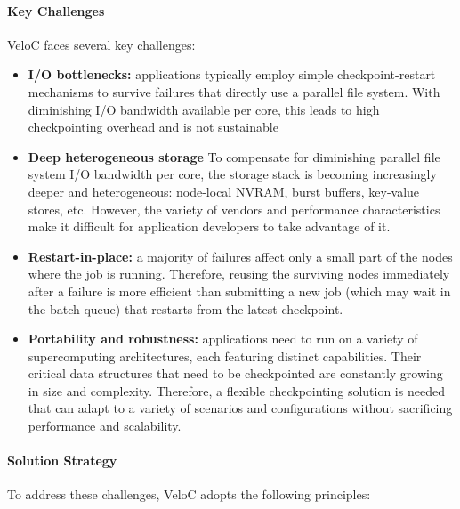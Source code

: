 \paragraph{Key Challenges}
VeloC faces several key challenges:
\begin{itemize}
    \item \textbf{I/O bottlenecks:} applications typically employ simple checkpoint-restart mechanisms to survive failures that directly use a parallel file system. With diminishing I/O bandwidth available per 
    core, this leads to high checkpointing overhead and is not sustainable
    \item \textbf{Deep heterogeneous storage} To compensate for diminishing
    parallel file system I/O bandwidth per core, the storage stack
    is becoming increasingly deeper and heterogeneous: node-local NVRAM, burst buffers, key-value stores, etc. However, the variety of vendors and performance characteristics make it difficult for application developers to take advantage of it.
    \item \textbf{Restart-in-place:} a majority of failures affect only a small
    part of the nodes where the job is running. Therefore, reusing the 
    surviving nodes immediately after a failure is more efficient than
    submitting a new job (which may wait in the batch queue) that restarts from the latest checkpoint.
    \item \textbf{Portability and robustness:} applications need to run on
    a variety of supercomputing architectures, each featuring distinct
    capabilities. Their critical data structures that need to be checkpointed are constantly growing in size and complexity. Therefore,
    a flexible checkpointing solution is needed that can adapt to a variety
    of scenarios and configurations without sacrificing performance and scalability.
\end{itemize}

\paragraph{Solution Strategy}

To address these challenges, VeloC adopts the following principles:

